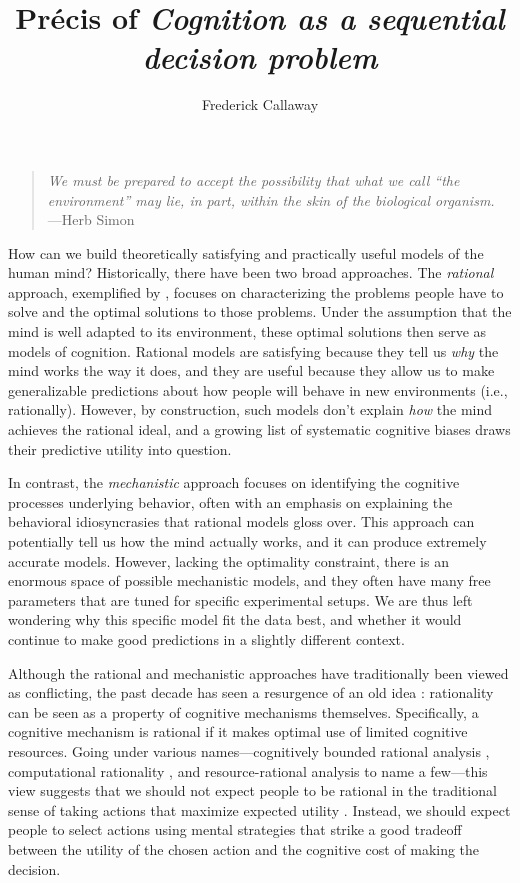 \documentclass[dsingle]{memo}
\title{Pr\'ecis of \emph{Cognition as a sequential decision problem}}
\author{Frederick Callaway}
\date{}
\begin{document}
\setstretch{\dnormalspacing}

\maketitle

\begin{quote}
\emph{We must be prepared to accept the possibility that what we call
``the environment'' may lie, in part, within the skin of the biological
organism.} ---Herb Simon \citeyearpar{simon1955behavioral}
\end{quote}

How can we build theoretically satisfying and practically useful models of the human mind? Historically, there have been two broad approaches. The \emph{rational} approach, exemplified by \citet{anderson1990adaptive}, focuses on characterizing the problems people have to solve and the optimal solutions to those problems. Under the assumption that the mind is well adapted to its environment, these optimal solutions then serve as models of cognition. Rational models are satisfying because they tell us \emph{why} the mind works the way it does, and they are useful because they allow us to make generalizable predictions about how people will behave in new environments (i.e., rationally). However, by construction, such models don't explain \emph{how} the mind achieves the rational ideal, and a growing list of systematic cognitive biases \citep{kahneman2011thinking} draws their predictive utility into question.

In contrast, the \emph{mechanistic} approach focuses on identifying the cognitive processes underlying behavior, often with an emphasis on explaining the behavioral idiosyncrasies that rational models gloss over. This approach can potentially tell us how the mind actually works, and it can produce extremely accurate models. However, lacking the optimality constraint, there is an enormous space of possible mechanistic models, and they often have many free parameters that are tuned for specific experimental setups. We are thus left wondering why this specific model fit the data best, and whether it would continue to make good predictions in a slightly different context.

Although the rational and mechanistic approaches have traditionally been viewed as conflicting, the past decade has seen a resurgence of an old idea \citep{simon1955behavioral}: rationality can be seen as a property of cognitive mechanisms themselves. Specifically, a cognitive mechanism is rational if it makes optimal use of limited cognitive resources. Going under various names---cognitively bounded rational analysis \citep{howes2009rational}, computational rationality \citep{lewis2014computational,gershman2015computational}, and resource-rational analysis \citep{griffiths2015rational,lieder2020resourcerational} to name a few---this view suggests that we should not expect people to be rational in the traditional sense of taking actions that maximize expected utility \citep{vonneumann1944theory}. Instead, we should expect people to select actions using mental strategies that strike a good tradeoff between the utility of the chosen action and the cognitive cost of making the decision.
\end{document}

